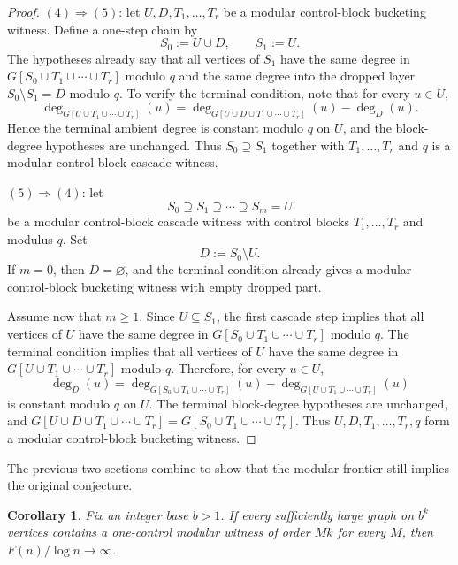 \documentclass[11pt]{amsart}
\newtheorem{corollary}[theorem]{Corollary}
\theoremstyle{definition}
\begin{document}
\begin{proof}
\smallskip

\noindent
$(4)\Rightarrow(5)$: let $U,D,T_1,\dots,T_r$ be a modular control-block bucketing witness. Define a
one-step chain by
\[
  S_0 := U \cup D, \qquad S_1 := U.
\]
The hypotheses already say that all vertices of $S_1$ have the same degree in
$G[S_0 \cup T_1 \cup \cdots \cup T_r]$ modulo $q$ and the same degree into the dropped layer
$S_0 \setminus S_1 = D$ modulo $q$. To verify the terminal condition, note that for every $u \in U$,
\[
  \deg_{G[U \cup T_1 \cup \cdots \cup T_r]}(u)
  =
  \deg_{G[U \cup D \cup T_1 \cup \cdots \cup T_r]}(u)-\deg_D(u).
\]
Hence the terminal ambient degree is constant modulo $q$ on $U$, and the block-degree hypotheses are
unchanged. Thus $S_0 \supseteq S_1$ together with $T_1,\dots,T_r$ and $q$ is a modular
control-block cascade witness.

\smallskip

\noindent
$(5)\Rightarrow(4)$: let
\[
  S_0 \supseteq S_1 \supseteq \cdots \supseteq S_m = U
\]
be a modular control-block cascade witness with control blocks $T_1,\dots,T_r$ and modulus $q$.
Set
\[
  D := S_0 \setminus U.
\]
If $m=0$, then $D=\varnothing$, and the terminal condition already gives a modular control-block
bucketing witness with empty dropped part.

Assume now that $m\ge 1$. Since $U \subseteq S_1$, the first cascade step implies that all vertices
of $U$ have the same degree in $G[S_0 \cup T_1 \cup \cdots \cup T_r]$ modulo $q$. The terminal
condition implies that all vertices of $U$ have the same degree in
$G[U \cup T_1 \cup \cdots \cup T_r]$ modulo $q$. Therefore, for every $u \in U$,
\[
  \deg_D(u)
  =
  \deg_{G[S_0 \cup T_1 \cup \cdots \cup T_r]}(u)
  -
  \deg_{G[U \cup T_1 \cup \cdots \cup T_r]}(u)
\]
is constant modulo $q$ on $U$. The terminal block-degree hypotheses are unchanged, and
$G[U \cup D \cup T_1 \cup \cdots \cup T_r]=G[S_0 \cup T_1 \cup \cdots \cup T_r]$. Thus
$U,D,T_1,\dots,T_r,q$ form a modular control-block bucketing witness.
\end{proof}

The previous two sections combine to show that the modular frontier still implies the original
conjecture.

\begin{corollary}\label{cor:frontier-implies-target}
Fix an integer base $b>1$. If every sufficiently large graph on $b^k$ vertices contains a
one-control modular witness of order $Mk$ for every $M$, then $F(n)/\log n \to \infty$.
\end{corollary}
\end{document}
